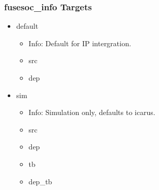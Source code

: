 \subsubsection{fusesoc\_info Targets}
\begin{itemize}
\item default
	\begin{itemize}
	\item[$\space$] Info: Default for IP intergration.
	\item src
	\item dep
	\end{itemize}
\item sim
	\begin{itemize}
	\item[$\space$] Info: Simulation only, defaults to icarus.
	\item src
	\item dep
	\item tb
	\item dep\_tb
	\end{itemize}
\end{itemize}

